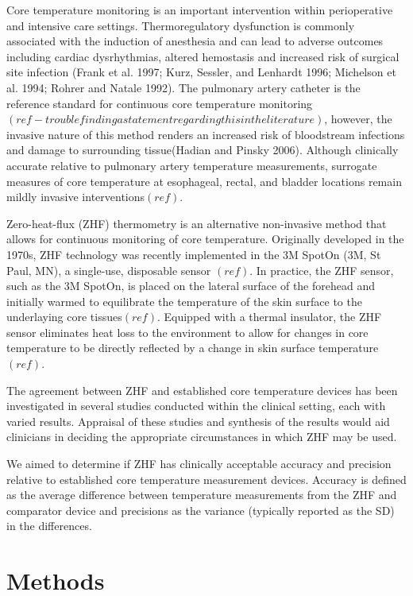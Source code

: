 \documentclass[smallextended]{svjour3}       %
\begin{document}
Core temperature monitoring is an important intervention within
perioperative and intensive care settings. Thermoregulatory dysfunction
is commonly associated with the induction of anesthesia and can lead to
adverse outcomes including cardiac dysrhythmias, altered hemostasis and
increased risk of surgical site infection (Frank et al. 1997; Kurz,
Sessler, and Lenhardt 1996; Michelson et al. 1994; Rohrer and Natale
1992). The pulmonary artery catheter is the reference standard for
continuous core temperature
monitoring\((ref - trouble finding a statement regarding this in the literature)\),
however, the invasive nature of this method renders an increased risk of
bloodstream infections and damage to surrounding tissue(Hadian and
Pinsky 2006). Although clinically accurate relative to pulmonary artery
temperature measurements, surrogate measures of core temperature at
esophageal, rectal, and bladder locations remain mildly invasive
interventions\((ref)\).

Zero-heat-flux (ZHF) thermometry is an alternative non-invasive method
that allows for continuous monitoring of core temperature. Originally
developed in the 1970s, ZHF technology was recently implemented in the
3M SpotOn (3M, St Paul, MN), a single-use, disposable sensor \((ref)\).
In practice, the ZHF sensor, such as the 3M SpotOn, is placed on the
lateral surface of the forehead and initially warmed to equilibrate the
temperature of the skin surface to the underlaying core
tissues\((ref)\). Equipped with a thermal insulator, the ZHF sensor
eliminates heat loss to the environment to allow for changes in core
temperature to be directly reflected by a change in skin surface
temperature \((ref)\).

The agreement between ZHF and established core temperature devices has
been investigated in several studies conducted within the clinical
setting, each with varied results. Appraisal of these studies and
synthesis of the results would aid clinicians in deciding the
appropriate circumstances in which ZHF may be used.

We aimed to determine if ZHF has clinically acceptable accuracy and
precision relative to established core temperature measurement devices.
Accuracy is defined as the average difference between temperature
measurements from the ZHF and comparator device and precisions as the
variance (typically reported as the SD) in the differences.

\hypertarget{methods}{%
\section{Methods}\label{methods}}
\end{document}
